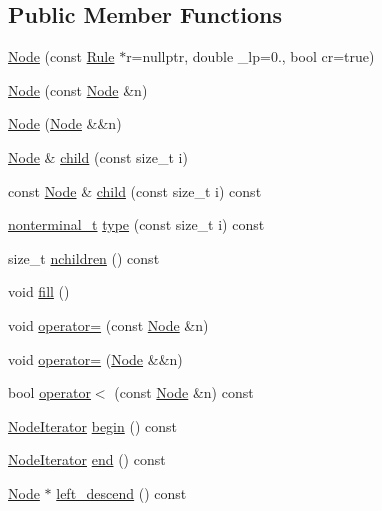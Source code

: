 \subsection*{Public Member Functions}
\begin{DoxyCompactItemize}
\item 
\hyperlink{class_node_ae33050869651f64551da2d13ad2a9dbc}{Node} (const \hyperlink{class_rule}{Rule} $\ast$r=nullptr, double \+\_\+lp=0., bool cr=true)
\item 
\hyperlink{class_node_a277918b68827f6ffd8150f450b0c12c3}{Node} (const \hyperlink{class_node}{Node} \&n)
\item 
\hyperlink{class_node_a87c9938dcd77c169802a732c98204945}{Node} (\hyperlink{class_node}{Node} \&\&n)
\item 
\hyperlink{class_node}{Node} \& \hyperlink{class_node_a23adfa03c20f4141b1105c5b4b1bca3f}{child} (const size\+\_\+t i)
\item 
const \hyperlink{class_node}{Node} \& \hyperlink{class_node_acc2b20cdba470853f1c137e26546ed3c}{child} (const size\+\_\+t i) const
\item 
\hyperlink{_nonterminal_8h_a5c1f658dc7560600a16d22408bd716ca}{nonterminal\+\_\+t} \hyperlink{class_node_aa727c354e38f60fb1560d72ae1aaa9af}{type} (const size\+\_\+t i) const
\item 
size\+\_\+t \hyperlink{class_node_a5d42219573573f6a91cdfe68fe415505}{nchildren} () const
\item 
void \hyperlink{class_node_a1c03973664fcfdfb191feb67f565168b}{fill} ()
\item 
void \hyperlink{class_node_addbfe90949f473c91203389f48095cf0}{operator=} (const \hyperlink{class_node}{Node} \&n)
\item 
void \hyperlink{class_node_abcd5c8ca2ea54716a72f7e27f9a9c937}{operator=} (\hyperlink{class_node}{Node} \&\&n)
\item 
bool \hyperlink{class_node_a8b05feb361beb04d465619751a2297b1}{operator$<$} (const \hyperlink{class_node}{Node} \&n) const
\item 
\hyperlink{class_node_1_1_node_iterator}{Node\+Iterator} \hyperlink{class_node_a319b65eca94c9438201ebda99ab90a65}{begin} () const
\item 
\hyperlink{class_node_1_1_node_iterator}{Node\+Iterator} \hyperlink{class_node_aea7c6e778d4720fb8071af71c57b1628}{end} () const
\item 
\hyperlink{class_node}{Node} $\ast$ \hyperlink{class_node_ac6d1a1d71a28168b34e9092568570738}{left\+\_\+descend} () const
\item 

\end{DoxyCompactItemize}
